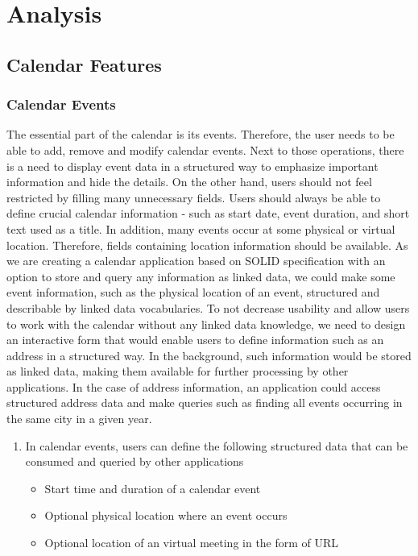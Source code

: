 \chapter{Analysis}

\section{Calendar Features}

\subsection*{Calendar Events}

The essential part of the calendar is its events. Therefore, the user needs to be able to add, remove and modify calendar events. Next to those operations, there is a need to display event data in a structured way to emphasize important information and hide the details. On the other hand, users should not feel restricted by filling many unnecessary fields. Users should always be able to define crucial calendar information - such as start date, event duration, and short text used as a title. In addition, many events occur at some physical or virtual location. Therefore, fields containing location information should be available. As we are creating a calendar application based on SOLID specification with an option to store and query any information as linked data, we could make some event information, such as the physical location of an event, structured and describable by linked data vocabularies. To not decrease usability and allow users to work with the calendar without any linked data knowledge, we need to design an interactive form that would enable users to define information such as an address in a structured way. In the background, such information would be stored as linked data, making them available for further processing by other applications. In the case of address information, an application could access structured address data and make queries such as finding all events occurring in the same city in a given year.

\begin{enumerate}[label=\color{reqcolor}\textbf{R{\arabic*}}]
    \item \label{app:req:events1} In calendar events, users can define the following structured data that can be consumed and queried by other applications
        \begin{itemize}
            \item Start time and duration of a calendar event
            \item Optional physical location where an event occurs
            \item Optional location of an virtual meeting in the form of URL
        \end{itemize}
\end{enumerate}


